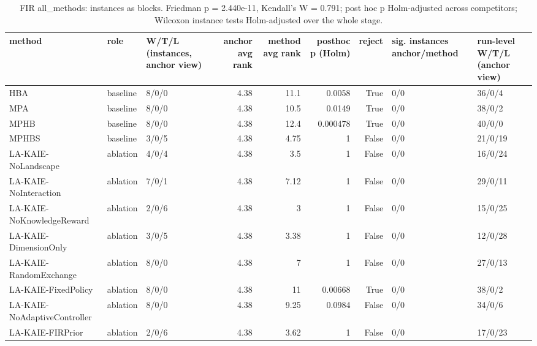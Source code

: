 \begin{table}[t]
\centering
\scriptsize
\caption{FIR all_methods: instances as blocks. Friedman p = 2.440e-11, Kendall's W = 0.791; post hoc p Holm-adjusted across competitors; Wilcoxon instance tests Holm-adjusted over the whole stage.}
\label{tab:fir_all_methods_global}
\begin{tabular}{lllrrrrll}
\toprule
method & role & W/T/L (instances, anchor view) & anchor avg rank & method avg rank & posthoc p (Holm) & reject & sig. instances anchor/method & run-level W/T/L (anchor view) \\
\midrule
HBA & baseline & 8/0/0 & 4.38 & 11.1 & 0.0058 & True & 0/0 & 36/0/4 \\
MPA & baseline & 8/0/0 & 4.38 & 10.5 & 0.0149 & True & 0/0 & 38/0/2 \\
MPHB & baseline & 8/0/0 & 4.38 & 12.4 & 0.000478 & True & 0/0 & 40/0/0 \\
MPHBS & baseline & 3/0/5 & 4.38 & 4.75 & 1 & False & 0/0 & 21/0/19 \\
LA-KAIE-NoLandscape & ablation & 4/0/4 & 4.38 & 3.5 & 1 & False & 0/0 & 16/0/24 \\
LA-KAIE-NoInteraction & ablation & 7/0/1 & 4.38 & 7.12 & 1 & False & 0/0 & 29/0/11 \\
LA-KAIE-NoKnowledgeReward & ablation & 2/0/6 & 4.38 & 3 & 1 & False & 0/0 & 15/0/25 \\
LA-KAIE-DimensionOnly & ablation & 3/0/5 & 4.38 & 3.38 & 1 & False & 0/0 & 12/0/28 \\
LA-KAIE-RandomExchange & ablation & 8/0/0 & 4.38 & 7 & 1 & False & 0/0 & 27/0/13 \\
LA-KAIE-FixedPolicy & ablation & 8/0/0 & 4.38 & 11 & 0.00668 & True & 0/0 & 38/0/2 \\
LA-KAIE-NoAdaptiveController & ablation & 8/0/0 & 4.38 & 9.25 & 0.0984 & False & 0/0 & 34/0/6 \\
LA-KAIE-FIRPrior & ablation & 2/0/6 & 4.38 & 3.62 & 1 & False & 0/0 & 17/0/23 \\
\bottomrule
\end{tabular}
\end{table}
